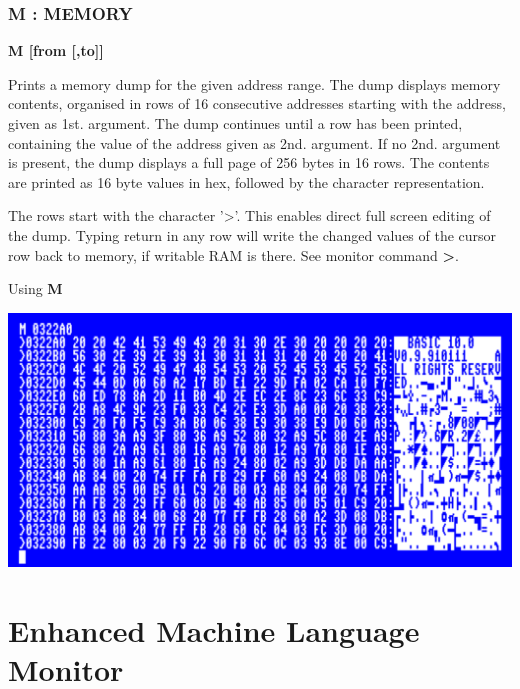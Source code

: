 
\subsubsection{M : MEMORY}
\begin{description}[leftmargin=2cm,style=nextline]
\item [Format:] {\bf M [from [,to]]}
\item [Usage:] Prints a memory dump for the given address range.
               The dump displays memory contents, organised in rows
               of 16 consecutive addresses starting with the
               address, given as 1st. argument. The dump continues
               until a row has been printed, containing the value
               of the address given as 2nd. argument.
               If no 2nd. argument is present, the dump displays
               a full page of 256 bytes in 16 rows.
               The contents are printed as 16 byte values in hex,
               followed by the character representation.

\item [Remarks:] The rows start with the character '>'.
                 This enables direct full screen editing of the dump.
                 Typing return in any row will write the changed
                 values of the cursor row back to memory, if writable RAM is there.
                 See monitor command {\bf >}.

\item [Example:] Using {\bf M}
\end{description}

\includegraphics[width=\linewidth]{images/monitor-m}

\section{Enhanced Machine Language Monitor}
\label{cha:MLMonitor}

